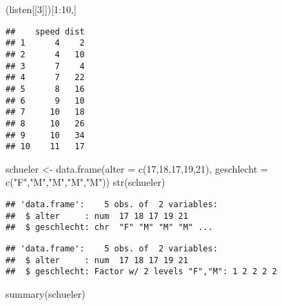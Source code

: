 \documentclass[
]{article}
\newenvironment{Shaded}{\begin{snugshade}}{\end{snugshade}}
\newcommand{\AttributeTok}[1]{\textcolor[rgb]{0.77,0.63,0.00}{#1}}
\newcommand{\DecValTok}[1]{\textcolor[rgb]{0.00,0.00,0.81}{#1}}
\newcommand{\FunctionTok}[1]{\textcolor[rgb]{0.00,0.00,0.00}{#1}}
\newcommand{\NormalTok}[1]{#1}
\newcommand{\OtherTok}[1]{\textcolor[rgb]{0.56,0.35,0.01}{#1}}
\newcommand{\SpecialCharTok}[1]{\textcolor[rgb]{0.00,0.00,0.00}{#1}}
\newcommand{\StringTok}[1]{\textcolor[rgb]{0.31,0.60,0.02}{#1}}
\begin{document}
\begin{Shaded}
\begin{Highlighting}[]
\NormalTok{(listen[[}\DecValTok{3}\NormalTok{]])[}\DecValTok{1}\SpecialCharTok{:}\DecValTok{10}\NormalTok{,]}
\end{Highlighting}
\end{Shaded}

\begin{verbatim}
##    speed dist
## 1      4    2
## 2      4   10
## 3      7    4
## 4      7   22
## 5      8   16
## 6      9   10
## 7     10   18
## 8     10   26
## 9     10   34
## 10    11   17
\end{verbatim}

\begin{Shaded}
\begin{Highlighting}[]
\NormalTok{schueler }\OtherTok{\textless{}{-}} \FunctionTok{data.frame}\NormalTok{(}\AttributeTok{alter =} \FunctionTok{c}\NormalTok{(}\DecValTok{17}\NormalTok{,}\DecValTok{18}\NormalTok{,}\DecValTok{17}\NormalTok{,}\DecValTok{19}\NormalTok{,}\DecValTok{21}\NormalTok{), }\AttributeTok{geschlecht =} \FunctionTok{c}\NormalTok{(}\StringTok{"F"}\NormalTok{,}\StringTok{"M"}\NormalTok{,}\StringTok{"M"}\NormalTok{,}\StringTok{"M"}\NormalTok{,}\StringTok{"M"}\NormalTok{))}
\FunctionTok{str}\NormalTok{(schueler)}
\end{Highlighting}
\end{Shaded}

\begin{verbatim}
## 'data.frame':    5 obs. of  2 variables:
##  $ alter     : num  17 18 17 19 21
##  $ geschlecht: chr  "F" "M" "M" "M" ...
\end{verbatim}

\begin{Shaded}
\end{Shaded}

\begin{verbatim}
## 'data.frame':    5 obs. of  2 variables:
##  $ alter     : num  17 18 17 19 21
##  $ geschlecht: Factor w/ 2 levels "F","M": 1 2 2 2 2
\end{verbatim}

\begin{Shaded}
\begin{Highlighting}[]
\FunctionTok{summary}\NormalTok{(schueler)}
\end{Highlighting}
\end{Shaded}
\end{document}

